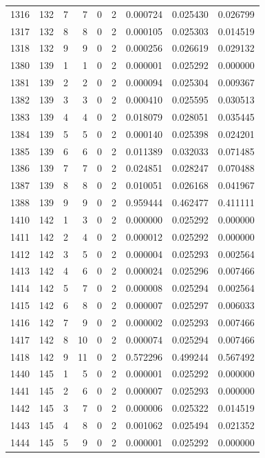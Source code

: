 \begin{longtable}{rrrrrrrrr}
1316 & 132 & 7 & 7 & 0 & 2 & 0.000724 & 0.025430 & 0.026799 \\
1317 & 132 & 8 & 8 & 0 & 2 & 0.000105 & 0.025303 & 0.014519 \\
1318 & 132 & 9 & 9 & 0 & 2 & 0.000256 & 0.026619 & 0.029132 \\
1380 & 139 & 1 & 1 & 0 & 2 & 0.000001 & 0.025292 & 0.000000 \\
1381 & 139 & 2 & 2 & 0 & 2 & 0.000094 & 0.025304 & 0.009367 \\
1382 & 139 & 3 & 3 & 0 & 2 & 0.000410 & 0.025595 & 0.030513 \\
1383 & 139 & 4 & 4 & 0 & 2 & 0.018079 & 0.028051 & 0.035445 \\
1384 & 139 & 5 & 5 & 0 & 2 & 0.000140 & 0.025398 & 0.024201 \\
1385 & 139 & 6 & 6 & 0 & 2 & 0.011389 & 0.032033 & 0.071485 \\
1386 & 139 & 7 & 7 & 0 & 2 & 0.024851 & 0.028247 & 0.070488 \\
1387 & 139 & 8 & 8 & 0 & 2 & 0.010051 & 0.026168 & 0.041967 \\
1388 & 139 & 9 & 9 & 0 & 2 & 0.959444 & 0.462477 & 0.411111 \\
1410 & 142 & 1 & 3 & 0 & 2 & 0.000000 & 0.025292 & 0.000000 \\
1411 & 142 & 2 & 4 & 0 & 2 & 0.000012 & 0.025292 & 0.000000 \\
1412 & 142 & 3 & 5 & 0 & 2 & 0.000004 & 0.025293 & 0.002564 \\
1413 & 142 & 4 & 6 & 0 & 2 & 0.000024 & 0.025296 & 0.007466 \\
1414 & 142 & 5 & 7 & 0 & 2 & 0.000008 & 0.025294 & 0.002564 \\
1415 & 142 & 6 & 8 & 0 & 2 & 0.000007 & 0.025297 & 0.006033 \\
1416 & 142 & 7 & 9 & 0 & 2 & 0.000002 & 0.025293 & 0.007466 \\
1417 & 142 & 8 & 10 & 0 & 2 & 0.000074 & 0.025294 & 0.007466 \\
1418 & 142 & 9 & 11 & 0 & 2 & 0.572296 & 0.499244 & 0.567492 \\
1440 & 145 & 1 & 5 & 0 & 2 & 0.000001 & 0.025292 & 0.000000 \\
1441 & 145 & 2 & 6 & 0 & 2 & 0.000007 & 0.025293 & 0.000000 \\
1442 & 145 & 3 & 7 & 0 & 2 & 0.000006 & 0.025322 & 0.014519 \\
1443 & 145 & 4 & 8 & 0 & 2 & 0.001062 & 0.025494 & 0.021352 \\
1444 & 145 & 5 & 9 & 0 & 2 & 0.000001 & 0.025292 & 0.000000 \\

\end{longtable}

